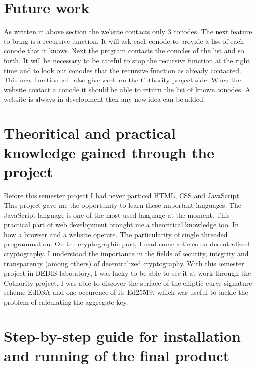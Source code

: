 \documentclass[11pt, a4paper, twoside, openright, openany]{article}
\begin{document}
\section{Future work}
As written in above section the website contacts only 3 conodes. The next feature
to bring is a recursive function. It will ask each conode to provide a list of each conode
that it knows. Next the program contacts the conodes of the list and so forth.
\newline
It will be necessary to be careful to stop the recursive function at the right time and
to look out conodes that the recursive function as already contacted.
\newline
This new function will also give work on the Cothority project side. When the website
contact a conode it should be able to return the list of known conodes.
\newline \newline
A website is always in development then any new idea can be added.
\bigbreak

\section{Theoritical and practical knowledge gained through the project}
Before this semester project I had never particed HTML, CSS and JavaScript. This
project gave me the opportunity to learn these important languages. The JavaScript language is
one of the most used language at the moment.
\newline
This practical part of web development brought me a theoritical knowledge too.
In how a browser and a website operate. The particularity of single threaded programmation.
\newline \newline
On the cryptographic part, I read some articles on decentralized cryptography.
I understood the importance in the fields of security, integrity and transparency (among others) of decentralized cryptography.
With this semester project in DEDIS laboratory, I was lucky to be able to see it at work through the Cothority project.
\newline
I was able to discover the surface of the elliptic curve signature scheme EdDSA and
one occurence of it: Ed25519, which was useful to tackle the problem of calculating the aggregate-key.
\bigbreak

\section{Step-by-step guide for installation and running of the final product}
\end{document}

